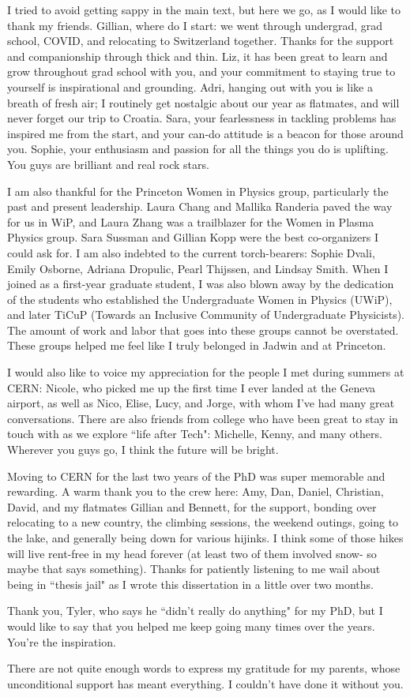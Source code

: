 I tried to avoid getting sappy in the main text, but here we go, as I would like to thank my friends. Gillian, where do I start: we went through undergrad, grad school, COVID, and relocating to Switzerland together. Thanks for the support and companionship through thick and thin. Liz, it has been great to learn and grow throughout grad school with you, and your commitment to staying true to yourself is inspirational and grounding. Adri, hanging out with you is like a breath of fresh air; I routinely get nostalgic about our year as flatmates, and will never forget our trip to Croatia. Sara, your fearlessness in tackling problems has inspired me from the start, and your can-do attitude is a beacon for those around you. Sophie, your enthusiasm and passion for all the things you do is uplifting. You guys are brilliant and real rock stars.

I am also thankful for the Princeton Women in Physics group, particularly the past and present leadership. Laura Chang and Mallika Randeria paved the way for us in WiP, and Laura Zhang was a trailblazer for the Women in Plasma Physics group. Sara Sussman and Gillian Kopp were the best co-organizers I could ask for. I am also indebted to the current torch-bearers: Sophie Dvali, Emily Osborne, Adriana Dropulic, Pearl Thijssen, and Lindsay Smith. When I joined as a first-year graduate student, I was also blown away by the dedication of the students who established the Undergraduate Women in Physics (UWiP), and later TiCuP (Towards an Inclusive Community of Undergraduate Physicists). The amount of work and labor that goes into these groups cannot be overstated. These groups helped me feel like I truly belonged in Jadwin and at Princeton.

I would also like to voice my appreciation for the people I met during summers at CERN: Nicole, who picked me up the first time I ever landed at the Geneva airport, as well as Nico, Elise, Lucy, and Jorge, with whom I've had many great conversations. There are also friends from college who have been great to stay in touch with as we explore ``life after Tech": Michelle, Kenny, and many others. Wherever you guys go, I think the future will be bright.

Moving to CERN for the last two years of the PhD was super memorable and rewarding. A warm thank you to the crew here: Amy, Dan, Daniel, Christian, David, and my flatmates Gillian and Bennett, for the support, bonding over relocating to a new country, the climbing sessions, the weekend outings, going to the lake, and generally being down for various hijinks. I think some of those hikes will live rent-free in my head forever (at least two of them involved snow- so maybe that says something). Thanks for patiently listening to me wail about being in ``thesis jail" as I wrote this dissertation in a little over two months.

Thank you, Tyler, who says he ``didn't really do anything" for my PhD, but I would like to say that you helped me keep going many times over the years. You're the inspiration.

There are not quite enough words to express my gratitude for my parents, whose unconditional support has meant everything. I couldn't have done it without you.
